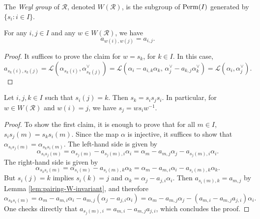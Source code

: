\begin{definition}\label{def:Weylgroup}
    The {\it Weyl group} of $\mathcal{R}$, denoted $W(\mathcal{R})$, is the subgroup of ${\rm Perm}(I)$ 
    generated by $\{s_i : i \in I\}$. 
\end{definition}

\begin{lemma}\label{lem:pairing-W-invariant}
    For any $i,j \in I$ and any $w \in W(\mathcal{R})$, we have 
    \[
        a_{w(i),w(j)} = a_{i,j}.
    \]
\end{lemma}
\begin{proof}
    It suffices to prove the claim for $w = s_k$, for $k \in I$. In this case, 
    \begin{equation*}
        a_{s_k(i),s_k(j)} = \mathcal{L}(\alpha_{s_k(i)},\alpha^\vee_{s_k(j)})
        = \mathcal{L}(\alpha_{i} - a_{i,k}\alpha_k,\, \alpha^\vee_{j} - a_{k,j} \alpha_k^\vee)
         = \mathcal{L}(\alpha_{i},\alpha^\vee_{j}).
    \end{equation*}
\end{proof}

\begin{lemma}\label{lem:s_i-are-reflections}
    Let $i,j,k \in I$ such that $s_i(j) = k$. Then $s_k = s_is_js_i$. In particular, for 
    $w \in W(\mathcal{R})$ and $w(i) = j$, we have $s_j = ws_iw^{-1}$. 
\end{lemma}
\begin{proof}
To show the first claim, it is enough to prove that for all $m \in I$, $s_is_j(m) = s_ks_i(m)$. Since the map $\alpha$ is injective, it suffices to show that  $\alpha_{s_is_j(m)} = \alpha_{s_ks_i(m)}$. The left-hand side is given by
\begin{equation*}
    \alpha_{s_is_j(m)} = \alpha_{s_j(m)} - a_{s_j(m),i}\alpha_i = \alpha_m - a_{m,j}\alpha_j - a_{s_j(m),i}\alpha_i.
\end{equation*}
The right-hand side is given by
\begin{equation*}
    \alpha_{s_ks_i(m)} = \alpha_{s_i(m)} - a_{s_i(m),k}\alpha_k = \alpha_m - a_{m,i}\alpha_i - a_{s_i(m),k}\alpha_k.
\end{equation*}
But $s_i(j) = k$ implies $s_i(k) = j$ and  $\alpha_k = \alpha_j - a_{j,i}\alpha_i$. Then $a_{s_i(m),k} = a_{m,j}$ by Lemma \ref{lem:pairing-W-invariant}, and therefore
\begin{equation*}
    \alpha_{s_ks_i(m)} = \alpha_m - a_{m,i}\alpha_i - a_{m,j}(\alpha_j - a_{j,i}\alpha_i) = \alpha_m  - a_{m,j}\alpha_j - (a_{m,i} - a_{m,j}a_{j,i})\alpha_i.
\end{equation*}
One checks directly that $a_{s_j(m),i} = a_{m,i}-a_{m,j}a_{j,i}$, which concludes the proof. 
\end{proof}



